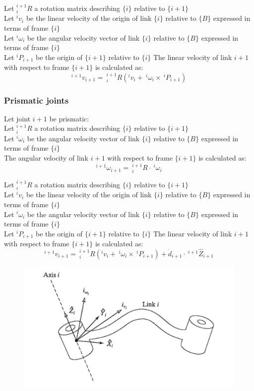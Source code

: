 \documentclass[10pt,a4paper]{article}
\begin{document}
Let $^{i+1}_iR$ a rotation matrix describing $\{i\}$ relative to $\{i+1\}$ \\
Let $^iv_i$ be the linear velocity of the origin of link $\{i\}$ relative to $\{B\}$ expressed in terms of frame $\{i\}$ \\
Let $^i\omega_i$ be the angular velocity vector of link $\{i\}$ relative to $\{B\}$ expressed in terms of frame $\{i\}$ \\
Let $^iP_{i+1}$ be the origin of $\{i+1\}$ relative to $\{i\}$
The linear velocity of link $i + 1$ with respect to frame $\{i + 1\}$ is calculated as:
$$
	^{i+1}v_{i+1} = ~^{i+1}_iR(^iv_i + ~^i\omega_i \times ~^iP_{i+1})
$$

\subsubsection{Prismatic joints}
Let joint $i+1$ be prismatic: \\

Let $^{i+1}_iR$ a rotation matrix describing $\{i\}$ relative to $\{i+1\}$ \\
Let $^i\omega_i$ be the angular velocity vector of link $\{i\}$ relative to $\{B\}$ expressed in terms of frame $\{i\}$ \\
The angular velocity of link $i + 1$ with respect to frame $\{i + 1\}$ is calculated as:
$$
	^{i+1}\omega_{i+1} = ~^{i+1}_iR ⋅ ~^i\omega_i
$$

Let $^{i+1}_iR$ a rotation matrix describing $\{i\}$ relative to $\{i+1\}$ \\
Let $^iv_i$ be the linear velocity of the origin of link $\{i\}$ relative to $\{B\}$ expressed in terms of frame $\{i\}$ \\
Let $^i\omega_i$ be the angular velocity vector of link $\{i\}$ relative to $\{B\}$ expressed in terms of frame $\{i\}$ \\
Let $^iP_{i+1}$ be the origin of $\{i+1\}$ relative to $\{i\}$
The linear velocity of link $i + 1$ with respect to frame $\{i + 1\}$ is calculated as:
$$
	^{i+1}v_{i+1} = ~^{i+1}_iR(^iv_i + ~^i\omega_i \times ~^iP_{i+1}) + \dot{d}_{i+1} ⋅ ~^{i+1}\hat{Z}_{i+1}
$$

\begin{figure}[H]
	\includegraphics[width=0.5\columnwidth]{imgs/velocity_link.png}
\end{figure}
\end{document}

